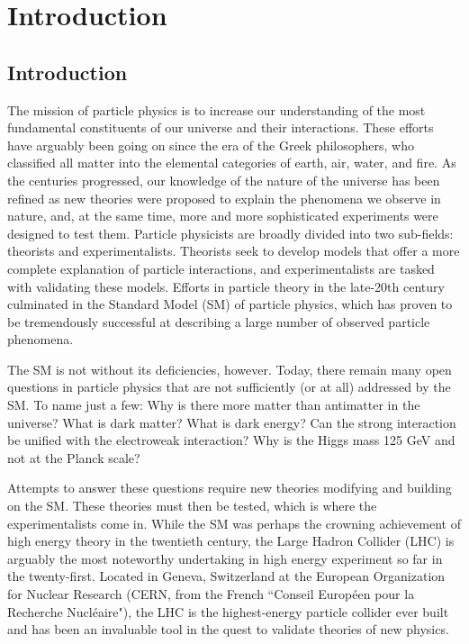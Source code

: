 \chapter{Introduction}

\section{Introduction}\label{sec:intro}

The mission of particle physics is to increase our understanding of the most fundamental constituents of our universe and their interactions. These efforts have arguably been going on since the era of the Greek philosophers, who classified all matter into the elemental categories of earth, air, water, and fire. As the centuries progressed, our knowledge of the nature of the universe has been refined as new theories were proposed to explain the phenomena we observe in nature, and, at the same time, more and more sophisticated experiments were designed to test them. Particle physicists are broadly divided into two sub-fields: theorists and experimentalists. Theorists seek to develop models that offer a more complete explanation of particle interactions, and experimentalists are tasked with validating these models. Efforts in particle theory in the late-20th century culminated in the Standard Model (SM) of particle physics, which has proven to be tremendously successful at describing a large number of observed particle phenomena.

The SM is not without its deficiencies, however. Today, there remain many open questions in particle physics that are not sufficiently (or at all) addressed by the SM. To name just a few: Why is there more matter than antimatter in the universe? What is dark matter? What is dark energy? Can the strong interaction be unified with the electroweak interaction?
Why is the Higgs mass 125 GeV and not at the Planck scale?

Attempts to answer these questions require new theories modifying and building on the SM. These theories must then be tested, which is where the experimentalists come in. While the SM was perhaps the crowning achievement of high energy theory in the twentieth century, the Large Hadron Collider (LHC) is arguably the most noteworthy undertaking in high energy experiment so far in the twenty-first. Located in Geneva, Switzerland at the European Organization for Nuclear Research (CERN, from the French ``Conseil Européen pour la Recherche Nucléaire"), the LHC is the highest-energy particle collider ever built and has been an invaluable tool in the quest to validate theories of new physics.

